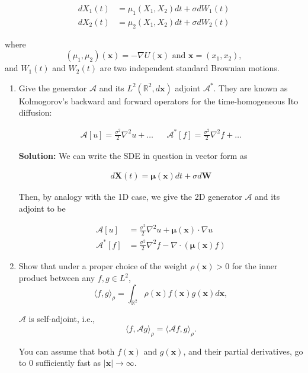 \documentclass[12pt, a4paper]{article}
\begin{document}
\begin{enumerate}
    \begin{align*}
        dX_1(t) &= \mu_1(X_1, X_2)dt+\sigma dW_1(t) \\
        dX_2(t) &= \mu_2(X_1, X_2)dt + \sigma dW_2(t) 
    \end{align*}

    where $$(\mu_1, \mu_2)(\mathbf x) = -\nabla U(\mathbf x) \text{ and } \mathbf x = (x_1, x_2),$$ and $W_1(t)$ and $W_2(t)$ are two independent standard Brownian motions.

    \begin{enumerate}
        \item Give the generator $\mathcal A$ and its $L^2(\mathbb R^2, d\mathbf x)$ adjoint $\mathcal A^*$. They are known as Kolmogorov's backward and forward operators for the time-homogeneous Ito diffusion: 
        
        \begin{align*}
            \mathcal A[u] = \frac{\sigma^2}{2}\nabla^2 u + \dots && \mathcal A^*[f] = \frac{\sigma^2}{2}\nabla^2 f + \dots
        \end{align*}

        \textbf{Solution:} We can write the SDE in question in vector form as 

        \begin{align*}
            d \mathbf X(t)  = \boldsymbol \mu(\mathbf x) dt + \sigma d\mathbf W
        \end{align*}

        Then, by analogy with the 1D case, we give the 2D generator $\mathcal A$ and its adjoint to be 

        \begin{align*}
            \mathcal A[u] &= \frac{\sigma^2}{2} \nabla^2 u + \boldsymbol \mu(\mathbf x) \cdot \nabla u \\
            \mathcal A^*[f] &= \frac{\sigma^2}{2} \nabla^2 f - \nabla \cdot (\boldsymbol \mu(\mathbf x) f)
        \end{align*}

        \item Show that under a proper choice of the weight $\rho(\mathbf x) >0$ for the inner product between any $f, g \in L^2$, $$\langle f, g \rangle_\rho = \int_{\mathbb R^2} \rho(\mathbf x) f(\mathbf x) g(\mathbf x) d\mathbf x,$$
        
        $\mathcal A$ is self-adjoint, i.e., $$\langle f, \mathcal A g \rangle_\rho = \langle \mathcal A f, g \rangle_\rho.$$

        You can assume that both $f(\mathbf x)$ and $g(\mathbf x)$, and their partial derivatives, go to $0$ sufficiently fast as $|\mathbf x| \rightarrow \infty$. 


\end{enumerate}
\end{enumerate}
\end{document}
